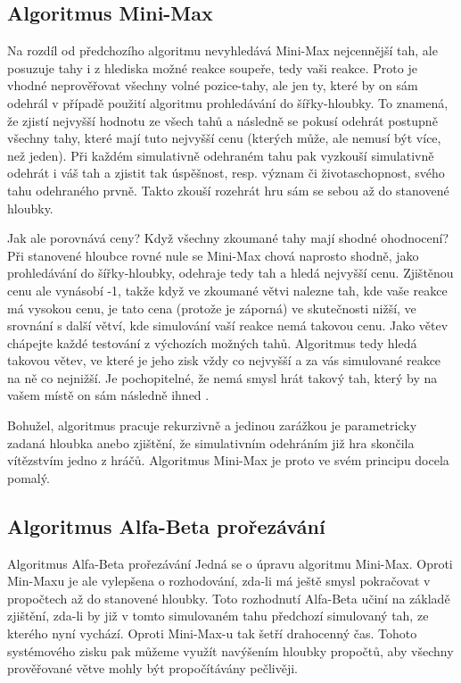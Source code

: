 \documentclass[a4paper,11pt,titlepage]{article}
\begin{document}
\subsection{Algoritmus Mini-Max}
Na rozdíl od předchozího algoritmu nevyhledává Mini-Max nejcennější tah, ale
posuzuje tahy i z hlediska možné reakce soupeře, tedy vaši reakce. Proto je vhodné
neprověřovat všechny volné pozice-tahy, ale jen ty, které by on sám odehrál v případě
použití algoritmu prohledávání do šířky-hloubky. To znamená, že zjistí nejvyšší hodnotu
ze všech tahů a následně se pokusí odehrát postupně všechny tahy, které mají tuto
nejvyšší cenu (kterých může, ale nemusí být více, než jeden). Při každém simulativně
odehraném tahu pak vyzkouší simulativně odehrát i váš tah a zjistit tak úspěšnost, resp.
význam či životaschopnost, svého tahu odehraného prvně. Takto zkouší rozehrát hru sám
se sebou až do stanovené hloubky.

Jak ale porovnává ceny? Když všechny zkoumané tahy mají shodné ohodnocení? Při
stanovené hloubce rovné nule se Mini-Max chová naprosto shodně, jako prohledávání do
šířky-hloubky, odehraje tedy tah a hledá nej\-vyš\-ší cenu. Zjištěnou cenu ale vynásobí -1,
takže když ve zkoumané větvi nalezne tah, kde vaše reakce má vysokou cenu, je tato
cena (protože je záporná) ve skutečnosti nižší, ve srovnání s další větví, kde simulování
vaší reakce nemá takovou cenu. Jako větev chápejte každé testování z výchozích
možných tahů. Algoritmus tedy hledá takovou větev, ve které je jeho zisk vždy co
nejvyšší a za vás simulované reakce na ně co nejnižší. Je pochopitelné, že nemá smysl
hrát takový tah, který by na vašem místě on sám následně ihned .

Bohužel, algoritmus pracuje rekurzivně a jedinou zarážkou je parametricky zadaná
hloubka anebo zjištění, že simulativním odehráním již hra skončila vítězstvím jedno
z hráčů. Algoritmus Mini-Max je proto ve svém principu docela pomalý.
\subsection{Algoritmus Alfa-Beta prořezávání}
Algoritmus Alfa-Beta prořezávání
Jedná se o úpravu algoritmu Mini-Max. Oproti Min-Maxu je ale vylepšena o
rozhodování, zda-li má ještě smysl pokračovat v propočtech až do stanovené hloubky.
Toto rozhodnutí Alfa-Beta učiní na základě zjištění, zda-li by již v tomto simulovaném
tahu  předchozí simulovaný tah, ze kterého nyní vychází. Oproti Mini-Max-u tak
šetří drahocenný čas. Tohoto systémového zisku pak můžeme využít navýšením hloubky
propočtů, aby všechny prověřované větve mohly být propočítávány pečlivěji.
\end{document}
